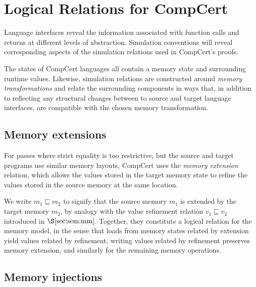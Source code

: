 \documentclass[sigplan,10pt,review,anonymous]{acmart}\settopmatter{printfolios=true,printccs=false,printacmref=false}
\begin{document}

\section{Logical Relations for CompCert} \label{sec:cklr} %

Language interfaces reveal the information
associated with function calls and returns
at different levels of abstraction.
Simulation conventions will
reveal corresponding aspects of the simulation relations
used in CompCert's proofs.

The states of CompCert languages all contain
a memory state and surrounding runtime values.
Likewise, simulation relations
are constructed around \emph{memory transformations}
and relate the surrounding components in ways that,
in addition to reflecting any structural changes
between to source and target language interfaces,
are compatible with the chosen memory transformation.

\subsection{Memory extensions} \label{sec:memext} %

For passes where strict equality is too restrictive,
but the source and target programs
use similar memory layouts,
CompCert uses the \emph{memory extension} relation,
which allows the values
stored in the target memory state to refine
the values stored in the source memory at the same location.

We write $m_1 \sqsubseteq m_2$ to signify that
the source memory $m_1$ is extended by
the target memory $m_2$,
by analogy with
the value refinement relation $v_1 \sqsubseteq v_2$
introduced in $\S\ref{sec:sem:mm}$.
Together,
they
constitute a logical relation for the memory model,
in the sense that
loads from memory states related by extension
yield values related by refinement,
writing values related by refinement
preserves memory extension,
and similarly for the remaining memory operations.


\subsection{Memory injections} \label{sec:meminj} %
\end{document}
